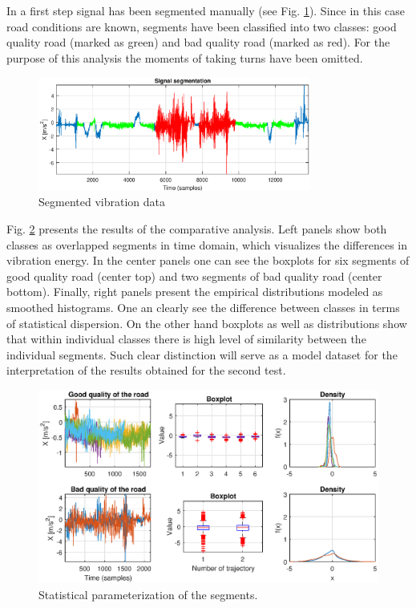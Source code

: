 \documentclass[10pt]{article}
\begin{document}
In a first step signal has been segmented manually (see Fig. \ref{fig:seg}). Since in this case road conditions are known, segments have been classified into two classes: good quality road (marked as green) and bad quality road (marked as red). For the purpose of this analysis the moments of taking turns have been omitted.

\begin{figure}[ht!]
\centering
\includegraphics[width=0.8\textwidth]{wykresy/Seg.eps}
\caption{Segmented vibration data}
\label{fig:seg}
\end{figure}

Fig. \ref{fig:stat} presents the results of the comparative analysis. Left panels show both classes as overlapped segments in time domain, which visualizes the differences in vibration energy. In the center panels one can see the boxplots for six segments of good quality road (center top) and two segments of bad quality road (center bottom). Finally, right panels present the empirical distributions modeled as smoothed histograms. One an clearly see the difference between classes in terms of statistical dispersion. On the other hand boxplots as well as distributions show that within individual classes there is high level of similarity between the individual segments. Such clear distinction will serve as a model dataset for the interpretation of the results obtained for the second test.

\begin{figure}[ht!]
\centering
\includegraphics[width=\textwidth]{wykresy/stat.eps}
\caption{Statistical parameterization of the segments.}
\label{fig:stat}
\end{figure}
\end{document}

